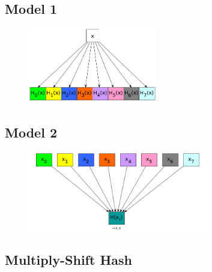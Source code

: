 \documentclass[11pt,oneside,a4paper]{article}
\begin{document}
\subsection{Model 1}
\begin{figure}[H]
\centering
\includegraphics[width=0.5\textwidth]{one_data_multi_hash.png} 
\end{figure}
\subsection{Model 2}
\begin{figure}[H]
\centering
\includegraphics[width=0.7\textwidth]{multi_data_single_hash.png} 
\end{figure}
\subsection{Multiply-Shift Hash}
\begin{algorithm}[H]
\begin{algorithmic}[1]



\EndFunction
\end{algorithmic}


\end{algorithm}
\end{document}
